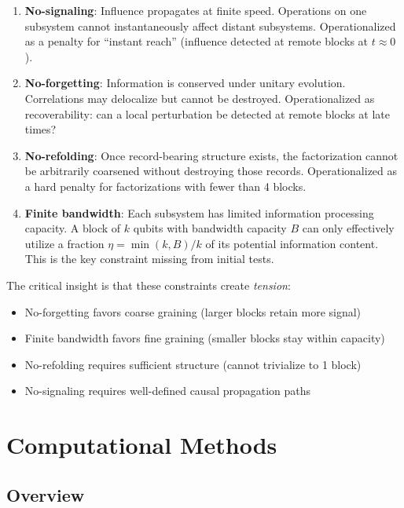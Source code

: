 \documentclass[11pt]{article}
\begin{document}
\begin{enumerate}
    \item \textbf{No-signaling}: Influence propagates at finite speed. Operations 
    on one subsystem cannot instantaneously affect distant subsystems. Operationalized 
    as a penalty for ``instant reach'' (influence detected at remote blocks at $t \approx 0$).
    
    \item \textbf{No-forgetting}: Information is conserved under unitary evolution. 
    Correlations may delocalize but cannot be destroyed. Operationalized as 
    recoverability: can a local perturbation be detected at remote blocks at late times?
    
    \item \textbf{No-refolding}: Once record-bearing structure exists, the 
    factorization cannot be arbitrarily coarsened without destroying those records.
    Operationalized as a hard penalty for factorizations with fewer than 4 blocks.
    
    \item \textbf{Finite bandwidth}: Each subsystem has limited information 
    processing capacity. A block of $k$ qubits with bandwidth capacity $B$ can 
    only effectively utilize a fraction $\eta = \min(k, B)/k$ of its potential 
    information content. This is the key constraint missing from initial tests.
\end{enumerate}

The critical insight is that these constraints create \emph{tension}:
\begin{itemize}
    \item No-forgetting favors coarse graining (larger blocks retain more signal)
    \item Finite bandwidth favors fine graining (smaller blocks stay within capacity)
    \item No-refolding requires sufficient structure (cannot trivialize to 1 block)
    \item No-signaling requires well-defined causal propagation paths
\end{itemize}

\section{Computational Methods}

\subsection{Overview}
\end{document}
